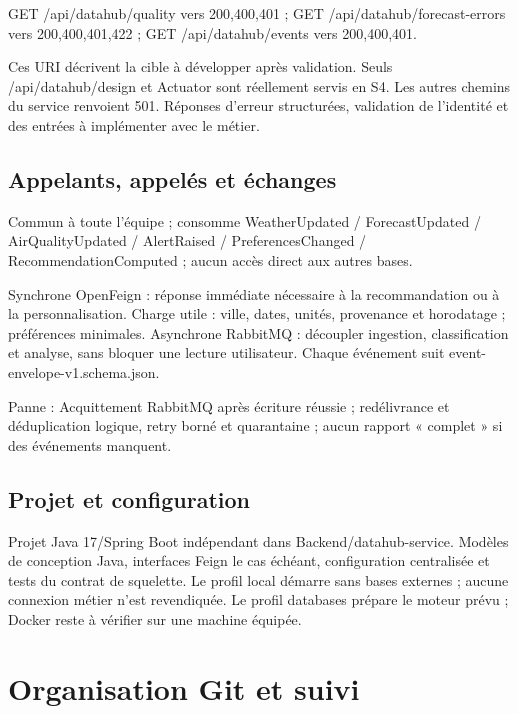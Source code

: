 \documentclass[10pt,a4paper]{article}
\begin{document}
GET /api/datahub/quality  vers  200,400,401 ; GET /api/datahub/forecast-errors  vers  200,400,401,422 ; GET /api/datahub/events  vers  200,400,401.\par

Ces URI décrivent la cible à développer après validation. Seuls /api/datahub/design et Actuator sont réellement servis en S4. Les autres chemins du service renvoient 501. Réponses d'erreur structurées, validation de l'identité et des entrées à implémenter avec le métier.\par

\subsection*{Appelants, appelés et échanges}

Commun à toute l'équipe ; consomme WeatherUpdated / ForecastUpdated / AirQualityUpdated / AlertRaised / PreferencesChanged / RecommendationComputed ; aucun accès direct aux autres bases.\par

Synchrone OpenFeign : réponse immédiate nécessaire à la recommandation ou à la personnalisation. Charge utile : ville, dates, unités, provenance et horodatage ; préférences minimales. Asynchrone RabbitMQ : découpler ingestion, classification et analyse, sans bloquer une lecture utilisateur. Chaque événement suit event-envelope-v1.schema.json.\par

Panne : Acquittement RabbitMQ après écriture réussie ; redélivrance et déduplication logique, retry borné et quarantaine ; aucun rapport « complet » si des événements manquent.\par

\subsection*{Projet et configuration}

Projet Java 17/Spring Boot indépendant dans Backend/datahub-service. Modèles de conception Java, interfaces Feign le cas échéant, configuration centralisée et tests du contrat de squelette. Le profil local démarre sans bases externes ; aucune connexion métier n'est revendiquée. Le profil databases prépare le moteur prévu ; Docker reste à vérifier sur une machine équipée.\par
\clearpage
\section*{Organisation Git et suivi}
\end{document}
